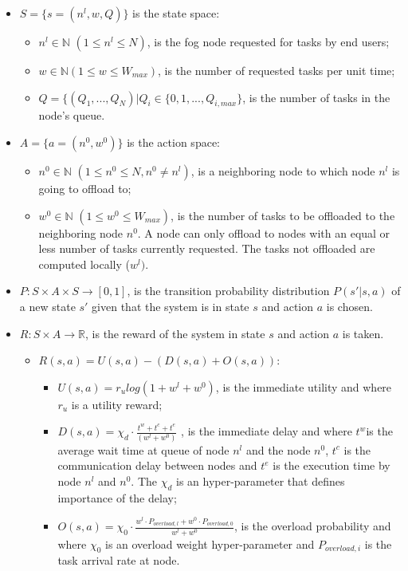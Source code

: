 \begin{itemize}
    \item $S = \{s=(n^l, w, Q)\}$ is the state space:
    \begin{itemize}
        \item $n^l \in \mathbb{N}$ $(1\leq n^l \leq N)$, is the fog node requested for tasks by end users;
        \item $w \in \mathbb{N} (1 \le w \le W_{max})$, is the number of requested tasks per unit time;
        \item $Q = \{(Q_1,...,Q_N)|Q_i\in\{0, 1,...,Q_{i,max}\}$, is the number of tasks in the node's queue.
    \end{itemize}
    \item $A = \{a=(n^0, w^0)\}$ is the action space:
    \begin{itemize}
        \item $n^0 \in \mathbb{N}$ $(1 \le n^0 \le N, n^0 \ne n^l)$, is a neighboring node to which node $n^l$ is going to offload to;
        \item $w^0 \in \mathbb{N}$ $(1 \le w^0 \le W_{max})$, is the number of tasks to be offloaded to the neighboring node $n^0$. A node can only offload to nodes with an equal or less number of tasks currently requested. The tasks not offloaded are computed locally ($w^l)$.
    \end{itemize}
    \item $P:S \times A \times S \rightarrow [0, 1]$, is the transition probability distribution $P(s'|s,a)$ of a new state $s'$ given that the system is in state $s$ and action $a$ is chosen.
    \item $R:S\times A \rightarrow \mathbb{R}$, is the reward of the system in state $s$ and action $a$ is taken.
    \begin{itemize}
        \item $R(s,a) = U(s, a) - (D(s,a) + O(s,a))$:
        \begin{itemize}
            \item $U(s, a) = r_u log(1+w^l + w^0)$, is the immediate utility and where $r_u$ is a utility reward;
            \item $D(s,a) = \chi_{d} \cdot \frac{t^w + t^c + t^e}{(w^l + w^0)}$ , is the immediate delay and where $t^w$is the average wait time at queue of node $n^l$ and the node $n^0$, $t^c$ is the communication delay between nodes and $t^e$ is the execution time by node $n^l$ and  $n^0$. The $\chi_d$ is an hyper-parameter that defines importance of the delay;
            \item $O(s, a) = \chi_{0} \cdot \frac{w^l \cdot P_{overload, l} + w^0 \cdot P_{overload, 0}}{w^l + w^0}$, is the overload probability and where $\chi_{0}$ is an overload weight hyper-parameter and $P_{overload, i}$ is the task arrival rate at node.
        \end{itemize}
    \end{itemize}
\end{itemize}

